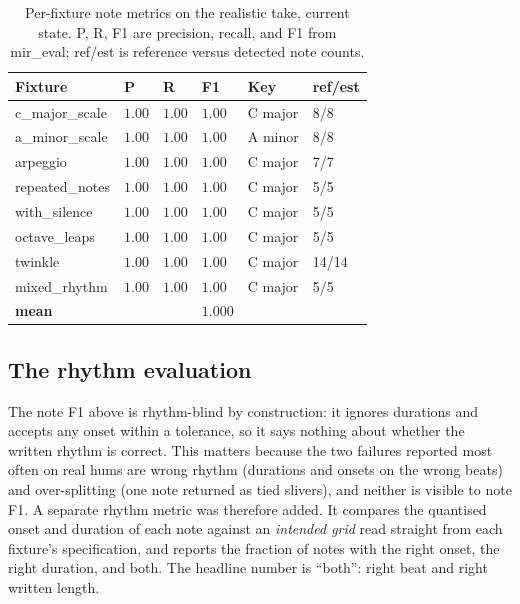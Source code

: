 \documentclass[12pt,a4paper]{article}
\begin{document}
\begin{table}[H]
\centering
\caption{Per-fixture note metrics on the realistic take, current state. P,
R, F1 are precision, recall, and F1 from mir\_eval; ref/est is
reference versus detected note counts.}
\label{tab:note-perfixture}
\begin{tabular}{l l l l l l}
\toprule
\textbf{Fixture} & \textbf{P} & \textbf{R} & \textbf{F1} & \textbf{Key} &
\textbf{ref/est} \\
\midrule
c\_major\_scale  & $1.00$ & $1.00$ & $1.00$ & C major & 8/8 \\
a\_minor\_scale  & $1.00$ & $1.00$ & $1.00$ & A minor & 8/8 \\
arpeggio         & $1.00$ & $1.00$ & $1.00$ & C major & 7/7 \\
repeated\_notes  & $1.00$ & $1.00$ & $1.00$ & C major & 5/5 \\
with\_silence    & $1.00$ & $1.00$ & $1.00$ & C major & 5/5 \\
octave\_leaps    & $1.00$ & $1.00$ & $1.00$ & C major & 5/5 \\
twinkle          & $1.00$ & $1.00$ & $1.00$ & C major & 14/14 \\
mixed\_rhythm    & $1.00$ & $1.00$ & $1.00$ & C major & 5/5 \\
\midrule
\textbf{mean}    &        &        & $1.000$ &        & \\
\bottomrule
\end{tabular}
\end{table}

\subsection{The rhythm evaluation}
\label{sec:results-rhythm}

The note F1 above is rhythm-blind by construction: it ignores durations and
accepts any onset within a tolerance, so it says nothing about whether the
written rhythm is correct. This matters because the two failures reported most
often on real hums are wrong rhythm (durations and onsets on the wrong beats)
and over-splitting (one note returned as tied slivers), and neither is visible
to note F1. A separate rhythm metric was therefore added. It compares the
quantised onset and duration of each note against an \emph{intended grid} read
straight from each fixture's specification, and reports the fraction of notes
with the right onset, the right duration, and both. The headline number is
``both'': right beat and right written length.
\end{document}
